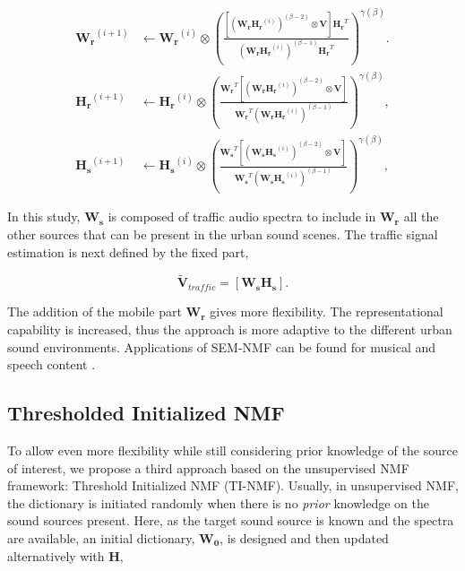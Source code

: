 \documentclass[review,5p,twocolumn,sort&compress,times]{elsarticle}
\begin{document}
{\scriptsize
\begin{subequations}\label{eq:WH-SSupdate}
\begin{align}
\mathbf{W_r}^{(i+1)} &\leftarrow \mathbf{W_r}^{(i)}\otimes\left(\frac{\left[\left(\mathbf{W_r H_r}^{(i)} \right)^{(\beta-2)}\otimes\mathbf{V} \right]\mathbf{H_r}^T}{\left(\mathbf{W_r H_r}^{(i)} \right)^{(\beta-1)}\mathbf{H_r}^T}\right)^{\gamma(\beta)}.\label{eq:W_r_SS}\\
\mathbf{H_r}^{(i+1)} &\leftarrow \mathbf{H_r}^{(i)}\otimes\left(\frac{\mathbf{W_r}^T \left[\left(\mathbf{W_r H_r}^{(i)} \right)^{(\beta-2)}\otimes\mathbf{V} \right]}{\mathbf{W_r}^T \left(\mathbf{W_r H_r}^{(i)} \right)^{(\beta-1)}}\right)^{\gamma(\beta)},\label{eq:H_r_SS}\\
\mathbf{H_s}^{(i+1)} &\leftarrow \mathbf{H_s}^{(i)}\otimes\left(\frac{\mathbf{W_s}^T \left[\left(\mathbf{W_s H_s}^{(i)} \right)^{(\beta-2)}\otimes\mathbf{V} \right]}{\mathbf{W_s}^T \left(\mathbf{W_s H_s}^{(i)} \right)^{(\beta-1)}}\right)^{\gamma(\beta)},\label{eq:H_s_SS}
\end{align}
\end{subequations}}

In this study, $\mathbf{W_s}$ is composed of traffic audio spectra to include in $\mathbf{W_r}$ all the other sources that can be present in the urban sound scenes. The traffic signal estimation is next defined by the fixed part,

\begin{equation}\label{eq:separationExtraction_SS}
\mathbf{\tilde{V}}_{traffic} = \left[ \mathbf{W_s H_s} \right].
\end{equation}

The addition of the mobile part $\mathbf{W_r}$ gives more flexibility. The representational capability is increased, thus the approach is more adaptive to the different urban sound environments. Applications of SEM-NMF can be found for musical \cite{weninger2012supervised, kitamura_music_2014} and speech content \cite{joder2012real, mysore2011non}.

\subsection{Thresholded Initialized NMF}\label{part:NMF_TI}

To allow even more flexibility while still considering prior knowledge of the source of interest, we propose a third approach based on the unsupervised NMF framework: Threshold Initialized NMF (TI-NMF). Usually, in unsupervised NMF, the dictionary is initiated randomly when there is no \textit{prior} knowledge on the sound sources present. Here, as the target sound source is known and the spectra are available, an initial dictionary, $\mathbf{W_0}$, is designed and then updated alternatively with $\mathbf{H}$,
\end{document}
